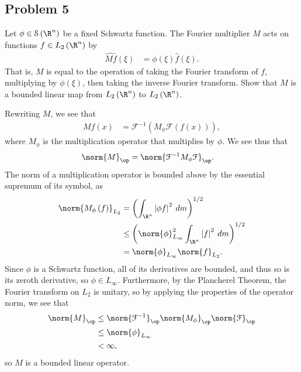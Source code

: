 \documentclass[10pt]{mypackage}
\begin{document}
\subsection{Problem 5}%
\begin{problem}
  Let $\phi\in \mathcal{S}\left( \R^n \right)$ be a fixed Schwartz function. The Fourier multiplier $M$ acts on functions $f\in L_2\left( \R^n \right)$ by
  \begin{align*}
    \widehat{Mf}\left( \xi \right) &= \phi\left( \xi \right)\hat{f}\left( \xi \right).
  \end{align*}
  That is, $M$ is equal to the operation of taking the Fourier transform of $f$, multiplying by $\phi\left( \xi \right)$, then taking the inverse Fourier transform. Show that $M$ is a bounded linear map from $L_2\left( \R^n \right)$ to $L_2\left( \R^n \right)$.
\end{problem}
Rewriting $M$, we see that
\begin{align*}
  Mf(x) &= \mathcal{F}^{-1}\left( M_{\phi}\mathcal{F}\left( f(x) \right) \right),
\end{align*}
where $M_{\phi}$ is the multiplication operator that multiplies by $\phi$. We see thus that
\begin{align*}
  \norm{M}_{\op} &= \norm{\mathcal{F}^{-1}M_{\phi}\mathcal{F}}_{\op}.
\end{align*}
The norm of a multiplication operator is bounded above by the essential supremum of its symbol, as
\begin{align*}
  \norm{M_{\phi}\left( f \right)}_{L_2} &= \left( \int_{\R^n}^{} \left\vert \phi f \right\vert^2\:dm \right)^{1/2}\\
                                        &\leq \left( \norm{\phi}_{L_{\infty}}^2 \int_{\R^n}^{} \left\vert f \right\vert^2\:dm \right)^{1/2}\\
                                        &= \norm{\phi}_{L_{\infty}}\norm{f}_{L_2}.
\end{align*}
Since $\phi$ is a Schwartz function, all of its derivatives are bounded, and thus so is its zeroth derivative, so $\phi\in L_{\infty}$. Furthermore, by the Plancherel Theorem, the Fourier transform on $L_2$ is unitary, so by applying the properties of the operator norm, we see that
\begin{align*}
  \norm{M}_{\op} &\leq \norm{\mathcal{F}^{-1}}_{\op}\norm{M_{\phi}}_{\op}\norm{\mathcal{F}}_{\op}\\
                 &\leq \norm{\phi}_{L_{\infty}}\\
                 &< \infty,
\end{align*}
so $M$ is a bounded linear operator.
\end{document}
